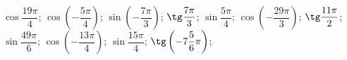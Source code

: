 \begin{ex}[type=calculate]
	\begin{condition}
		\( \cos\dfrac{19\pi}{4} \); \( \cos\left( -\dfrac{5\pi}{4} \right) \); \( \sin\left( -\dfrac{7\pi}{3} \right) \); \( \tg\dfrac{7\pi}{3} \); \( \sin\dfrac{5\pi}{4} \); \( \cos\left(- \dfrac{29\pi}{3} \right) \); \( \tg\dfrac{11\pi}{2} \); \( \sin\dfrac{49\pi}{6} \); \( \cos\left( -\dfrac{13\pi}{4}  \right)\); \( \sin\dfrac{15\pi}{4} \); \( \tg\left( -7\dfrac{5}{6} \pi \right)\);
	\end{condition}
\end{ex}